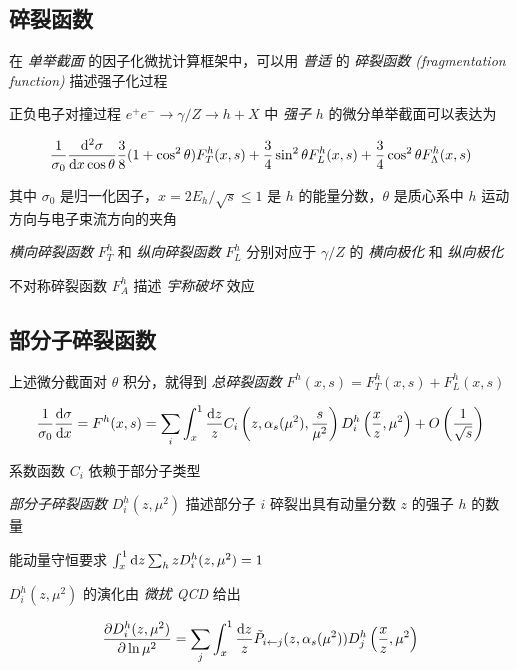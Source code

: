 \subsection{碎裂函数}

在 \emph{单举截面} 的因子化微扰计算框架中，可以用 \emph{普适} 的 \emph{碎裂函数 (fragmentation function)} 描述强子化过程

正负电子对撞过程 $e^+ e^- \to \gamma/Z \to h + X$ 中 \emph{强子} $h$ 的微分单举截面可以表达为

\begin{equation}
    \frac{1}{\sigma_0} \frac{\mathop{}\!\mathrm{d}^2 \sigma}{\mathop{}\!\mathrm{d} x \cos\theta} \frac{3}{8}(1+\cos^2 \theta) F_T^h (x, s) + \frac{3}{4} \sin^2 \theta F_L^h (x, s) + \frac{3}{4} \cos^2 \theta F_\Lambda^h (x, s)
\end{equation}

其中 $\sigma_0$ 是归一化因子，$x=2 E_h/\sqrt{s} \le 1$ 是 $h$ 的能量分数，$\theta$ 是质心系中 $h$ 运动方向与电子束流方向的夹角

\emph{横向碎裂函数} $F_T^h$ 和 \emph{纵向碎裂函数} $F_L^h$ 分别对应于 $\gamma/Z$ 的 \emph{横向极化} 和 \emph{纵向极化}

不对称碎裂函数 $F_A^h$ 描述 \emph{宇称破坏} 效应

\subsection{部分子碎裂函数}

上述微分截面对 $\theta$ 积分，就得到 \emph{总碎裂函数} $F^h(x, s)=F_T^h(x, s)+F_L^h(x, s)$

\begin{equation}
    \frac{1}{\sigma_0} \frac{\mathop{}\!\mathrm{d} \sigma}{\mathop{}\!\mathrm{d} x} = F^h(x, s) = \sum_i \int_x^1 \frac{\mathop{}\!\mathrm{d} z}{z} C_i \left(z,\alpha_s(\mu^2),\frac{s}{\mu^2}\right) D_i^h \left(\frac{x}{z}, \mu^2\right) + O \left(\frac{1}{\sqrt{s}}\right)
\end{equation}

系数函数 $C_i$ 依赖于部分子类型

\emph{部分子碎裂函数} $D_i^h(z, \mu^2)$ 描述部分子 $i$ 碎裂出具有动量分数 $z$ 的强子 $h$ 的数量

能动量守恒要求 $\int_x^1 \mathop{}\!\mathrm{d} z \sum_h z D_i^h (z, \mu^2)=1$

$D_i^h (z, \mu^2)$ 的演化由 \emph{微扰 QCD} 给出

\begin{equation}
    \frac{\partial D_i^h (z, \mu^2)}{\partial \ln \mu^2} = \sum_j \int_x^1 \frac{\mathop{}\!\mathrm{d} z}{z} \tilde{P}_{i \gets j} (z, \alpha_s(\mu^2)) D_j^h \left(\frac{x}{z}, \mu^2\right)
\end{equation}

